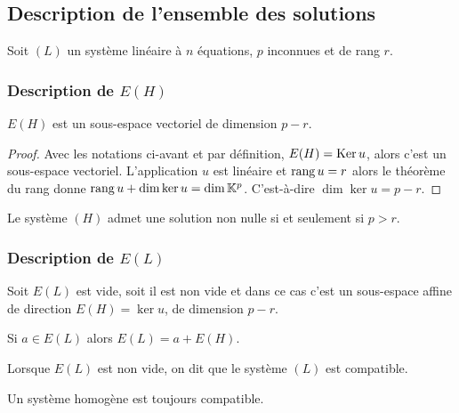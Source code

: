 \subsection{Description de l'ensemble des solutions}

Soit $(L)$ un système linéaire à $n$ équations, $p$ inconnues et de rang $r$.

\subsubsection{Description de $E(H)$}

\begin{theo}
  $E(H)$ est un sous-espace vectoriel de dimension $p-r$.
\end{theo}
\begin{proof}
  Avec les notations ci-avant et par définition, $E(H)=\operatorname{Ker} u$, alors c'est un sous-espace vectoriel. L'application $u$ est linéaire et $\operatorname{rang} u=r$ alors le théorème du rang donne $\operatorname{rang} u +\dim \ker u = \dim \mathbb{K}^p$. C'est-à-dire $\dim \ker u = p-r$.
\end{proof}
\begin{corth}
  Le système $(H)$ admet une solution non nulle si et seulement si $p>r$.
\end{corth}

\subsubsection{Description de $E(L)$}

\begin{theo}
  Soit $E(L)$ est vide, soit il est non vide et dans ce cas c'est un sous-espace affine de direction $E(H)=\ker u$, de dimension $p-r$.

  Si $a \in E(L)$ alors $E(L)=a+E(H)$.
\end{theo}
%
\begin{defdef}
  Lorsque $E(L)$ est non vide, on dit que le système $(L)$ est compatible.
\end{defdef}
%
Un système homogène est toujours compatible.
%
